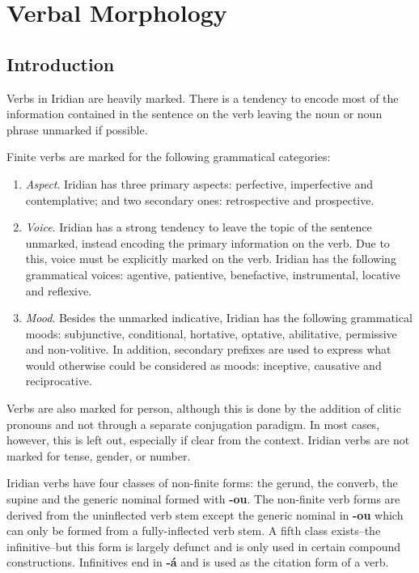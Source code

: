 \chapter{Verbal Morphology}
\section{Introduction}
Verbs in Iridian are heavily marked. There is a tendency to encode most of the information contained in the sentence on the verb leaving the noun or noun phrase unmarked if possible.

\par Finite verbs are marked for the following grammatical categories:
\begin{enumerate}
	\item \textit{Aspect}. Iridian has three primary aspects: perfective, imperfective and contemplative; and two secondary ones: retrospective and prospective.
	\item \textit{Voice}. Iridian has a strong tendency to leave the topic of the sentence unmarked, instead encoding the primary information on the verb. Due to this, voice must be explicitly marked on the verb. Iridian has the following grammatical voices: agentive, patientive, benefactive, instrumental, locative and reflexive.
	\item \textit{Mood}. Besides the unmarked indicative, Iridian has the following grammatical moods: subjunctive, conditional, hortative, optative, abilitative, permissive and non-volitive. In addition, secondary prefixes are used to express what would otherwise could be considered as moods: inceptive, causative and reciprocative.
\end{enumerate}

Verbs are also marked for person, although this is done by the addition of clitic pronouns and not through a separate conjugation paradigm. In most cases, however, this is left out, especially if clear from the context. Iridian verbs are not marked for tense, gender, or number.

\par Iridian verbs have four classes of non-finite forms: the gerund, the converb, the supine and the generic nominal formed with \textbf{-ou}. The non-finite verb forms are derived from the uninflected verb stem except the generic nominal in \textbf{-ou} which can only be formed from a fully-inflected verb stem. A fifth class exists--the infinitive--but this form is largely defunct and is only used in certain compound constructions. Infinitives end in \textbf{-á} and is used as the citation form of a verb.

